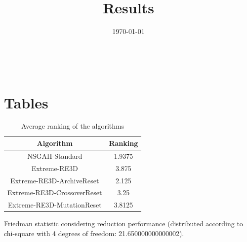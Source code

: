 \documentclass{article}
\title{Results}
\author{}
\date{\today}
\begin{document}
\oddsidemargin 0in \topmargin 0in\maketitle
\
\section{Tables}
\begin{table}[!htp]
\centering
\caption{Average ranking of the algorithms}
\begin{tabular}{c|c}
Algorithm&Ranking\\
\hline
NSGAII-Standard&1.9375\\
Extreme-RE3D&3.875\\
Extreme-RE3D-ArchiveReset&2.125\\
Extreme-RE3D-CrossoverReset&3.25\\
Extreme-RE3D-MutationReset&3.8125\\
\end{tabular}
\end{table}


Friedman statistic considering reduction performance (distributed according to chi-square with 4 degrees of freedom: 21.650000000000002).
\end{document}
